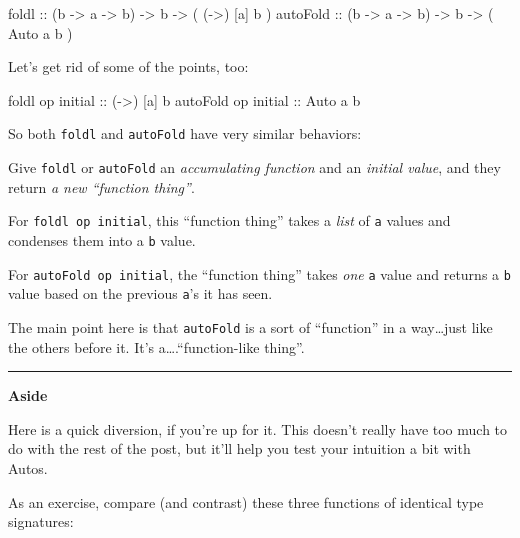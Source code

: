 \documentclass[]{article}
\newenvironment{Shaded}{}{}
\newcommand{\DataTypeTok}[1]{\textcolor[rgb]{0.56,0.13,0.00}{{#1}}}
\newcommand{\OtherTok}[1]{\textcolor[rgb]{0.00,0.44,0.13}{{#1}}}
\newcommand{\NormalTok}[1]{{#1}}
\begin{document}
\begin{Shaded}
\begin{Highlighting}[]
\NormalTok{foldl}\OtherTok{      ::} \NormalTok{(b }\OtherTok{->} \NormalTok{a }\OtherTok{->} \NormalTok{b) }\OtherTok{->} \NormalTok{b }\OtherTok{->} \NormalTok{( (}\OtherTok{->}\NormalTok{) [a] b )}
\OtherTok{autoFold   ::} \NormalTok{(b }\OtherTok{->} \NormalTok{a }\OtherTok{->} \NormalTok{b) }\OtherTok{->} \NormalTok{b }\OtherTok{->} \NormalTok{( }\DataTypeTok{Auto}  \NormalTok{a  b )}
\end{Highlighting}
\end{Shaded}

Let's get rid of some of the points, too:

\begin{Shaded}
\begin{Highlighting}[]
\NormalTok{foldl    op}\OtherTok{ initial  ::} \NormalTok{(}\OtherTok{->}\NormalTok{) [a] b}
\NormalTok{autoFold op}\OtherTok{ initial  ::} \DataTypeTok{Auto}  \NormalTok{a  b}
\end{Highlighting}
\end{Shaded}

So both \texttt{foldl} and \texttt{autoFold} have very similar behaviors:

Give \texttt{foldl} or \texttt{autoFold} an \emph{accumulating function} and an
\emph{initial value}, and they return \emph{a new ``function thing''}.

For \texttt{foldl\ op\ initial}, this ``function thing'' takes a \emph{list} of
\texttt{a} values and condenses them into a \texttt{b} value.

For \texttt{autoFold\ op\ initial}, the ``function thing'' takes \emph{one}
\texttt{a} value and returns a \texttt{b} value based on the previous
\texttt{a}'s it has seen.

The main point here is that \texttt{autoFold} is a sort of ``function'' in a
way\ldots{}just like the others before it. It's a\ldots{}.``function-like
thing''.

\begin{center}\rule{0.5\linewidth}{\linethickness}\end{center}

\textbf{Aside}

Here is a quick diversion, if you're up for it. This doesn't really have too
much to do with the rest of the post, but it'll help you test your intuition a
bit with Autos.

As an exercise, compare (and contrast) these three functions of identical type
signatures:
\end{document}
